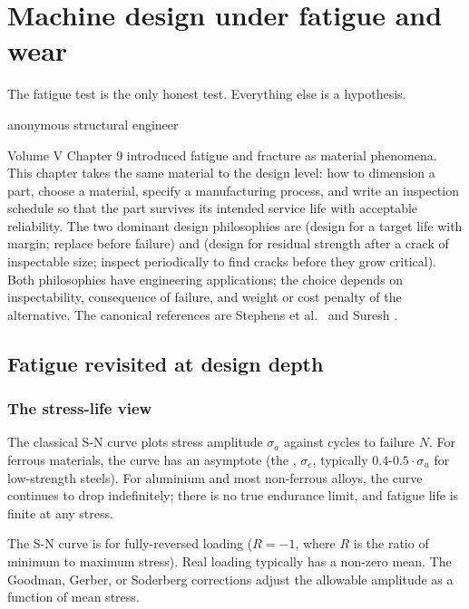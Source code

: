 \chapter{Machine design under fatigue and wear}
\label{vol08:ch04}

\epigraph{The fatigue test is the only honest test. Everything else is a hypothesis.}{anonymous structural engineer}


\noindent
Volume V Chapter 9 introduced fatigue and fracture as material phenomena. This chapter takes the same material to the design level: how to dimension a part, choose a material, specify a manufacturing process, and write an inspection schedule so that the part survives its intended service life with acceptable reliability. The two dominant design philosophies are  (design for a target life with margin; replace before failure) and  (design for residual strength after a crack of inspectable size; inspect periodically to find cracks before they grow critical). Both philosophies have engineering applications; the choice depends on inspectability, consequence of failure, and weight or cost penalty of the alternative. The canonical references are Stephens et al.\ \cite{text:stephens-fatigue} and Suresh \cite{text:suresh-fatigue}.

\section{Fatigue revisited at design depth}

\subsection{The stress-life view}

The classical S-N curve plots stress amplitude $\sigma_a$ against cycles to failure $N$. For ferrous materials, the curve has an asymptote (the , $\sigma_e$, typically $0.4$-$0.5 \cdot \sigma_u$ for low-strength steels). For aluminium and most non-ferrous alloys, the curve continues to drop indefinitely; there is no true endurance limit, and fatigue life is finite at any stress.

The S-N curve is for fully-reversed loading ($R = -1$, where $R$ is the ratio of minimum to maximum stress). Real loading typically has a non-zero mean. The Goodman, Gerber, or Soderberg corrections adjust the allowable amplitude as a function of mean stress.

